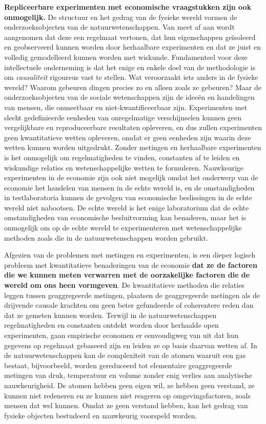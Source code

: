 \textbf{Repliceerbare experimenten met economische vraagstukken zijn ook onmogelijk.} De structuur en het gedrag van de fysieke wereld vormen de onderzoeksobjecten van de natuurwetenschappen. Van meet af aan wordt aangenomen dat deze een regelmaat vertonen, dat hun eigenschappen geïsoleerd en geobserveerd kunnen worden door herhaalbare experimenten en dat ze juist en volledig gemodelleerd kunnen worden met wiskunde. Fundamenteel voor deze intellectuele onderneming is dat het enige en enkele doel van de methodologie is om \textit{causaliteit} rigoureus vast te stellen. Wat veroorzaakt iets anders in de fysieke wereld? Waarom gebeuren dingen precies zo en alleen zoals ze gebeuren? Maar de onderzoeksobjecten van de sociale wetenschappen zijn de ideeën en handelingen van mensen, die onmeetbaar en niet-kwantificeerbaar zijn. Experimenten met slecht gedefinieerde eenheden van onregelmatige verschijnselen kunnen geen vergelijkbare en reproduceerbare resultaten opleveren, en dus zullen experimenten geen kwantitatieve wetten opleveren, omdat er geen eenheden zijn waarin deze wetten kunnen worden uitgedrukt. Zonder metingen en herhaalbare experimenten is het onmogelijk om regelmatigheden te vinden, constanten af te leiden en wiskundige relaties en wetenschappelijke wetten te formuleren. Nauwkeurige experimenten in de economie zijn ook niet mogelijk omdat het onderwerp van de economie het handelen van mensen in de echte wereld is, en de omstandigheden in testlaboratoria kunnen de gevolgen van economische beslissingen in de echte wereld niet nabootsen. De echte wereld is het enige laboratorium dat de echte omstandigheden van economische besluitvorming kan benaderen, maar het is onmogelijk om op de echte wereld te experimenteren met wetenschappelijke methoden zoals die in de natuurwetenschappen worden gebruikt.

Afgezien van de problemen met metingen en experimenten, is een dieper logisch probleem met kwantitatieve benaderingen van de economie \textbf{dat ze de factoren die we kunnen meten verwarren met de oorzakelijke factoren die de wereld om ons heen vormgeven}. De kwantitatieve methoden die relaties leggen tussen geaggregeerde metingen, plaatsen de geaggregeerde metingen als de drijvende causale krachten om geen beter gefundeerde of coherentere reden dan dat ze gemeten kunnen worden. Terwijl in de natuurwetenschappen regelmatigheden en constanten ontdekt worden door herhaalde open experimenten, gaan empirische economen er eenvoudigweg van uit dat hun gegevens op regelmaat gebaseerd zijn en leiden ze op basis daarvan wetten af. In de natuurwetenschappen kan de complexiteit van de atomen waaruit een gas bestaat, bijvoorbeeld, worden gereduceerd tot elementaire geaggregeerde metingen van druk, temperatuur en volume zonder enig verlies aan analytische nauwkeurigheid. De atomen hebben geen eigen wil, ze hebben geen verstand, ze kunnen niet redeneren en ze kunnen niet reageren op omgevingsfactoren, zoals mensen dat wel kunnen. Omdat ze geen verstand hebben, kan het gedrag van fysieke objecten bestudeerd en nauwkeurig voorspeld worden.

